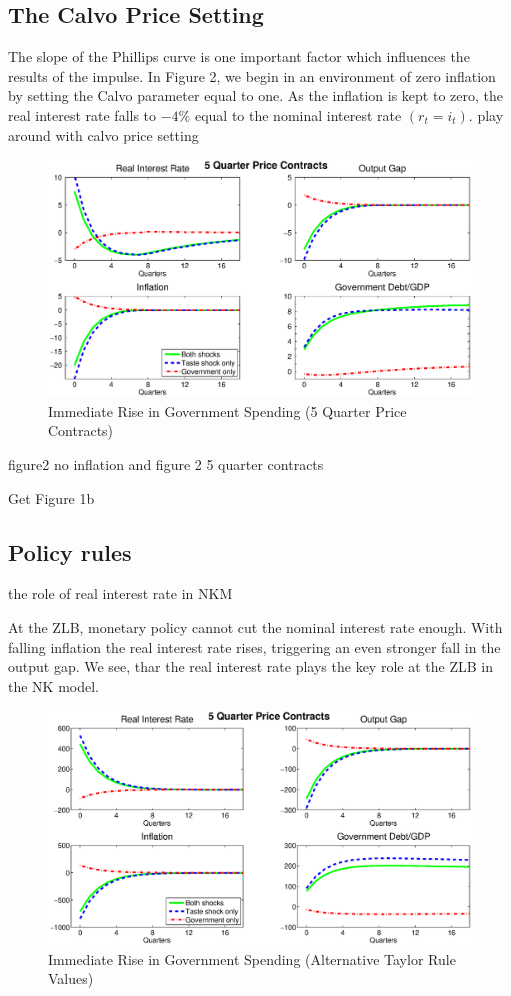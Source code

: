 \documentclass[12pt,a4paper,oneside,titlepage]{article}
\begin{document}
\subsection*{The Calvo Price Setting}
The slope of the Phillips curve is one important factor which influences the results of the impulse. In Figure 2, we begin in an environment of zero inflation by setting the Calvo parameter equal to one. 
As the inflation is kept to zero, the real interest rate falls to $-4\%$ equal to the nominal interest rate $\left(r_t = i_t\right)$. 
play around with calvo price setting
\begin{figure}[p]
\includegraphics[width=\textwidth]{Paperpics/Figure25quarter}
\caption{Immediate Rise in Government Spending (5 Quarter Price Contracts)}
\label{IR5quarter}
\end{figure}

figure2 no inflation and figure 2 5 quarter contracts

Get Figure 1b

\subsection*{Policy rules}
the role of real interest rate in NKM

At the ZLB, monetary policy cannot cut the nominal interest rate enough. With falling inflation the real interest rate rises, triggering an even stronger fall in the output gap. We see, thar the real interest rate plays the key role at the ZLB in the NK model.

\begin{figure}[p]
\includegraphics[width=\textwidth]{Paperpics/Figure25quarternewtaylorrule}
\caption{Immediate Rise in Government Spending (Alternative Taylor Rule Values)}
\label{IR5quarternewtr}
\end{figure}
\bigskip
\end{document}

